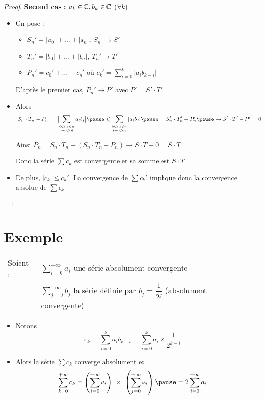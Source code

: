 \begin{frame}
\begin{proof}
\textbf{Second cas :} $a_k\in\mathbb{C}, b_k \in \mathbb{C}$ ($\forall k$)
\begin{itemize}
  \item\pause 
On pose :
\begin{itemize}
  \item $S_n'=|a_0|+\dots+|a_n|$, $S_n'\to S'$
  
  \item\pause $T_n'=|b_0|+\dots+|b_n|$, $T_n'\to T'$
  
  \item\pause $P_n'= c_0'+\dots+ c_n'$ o\`u $c_k'=\sum_{i=0}^k|a_ib_{k-i}|$
\end{itemize}
\pause
D'après le premier cas, $P_n'\to P'$ avec $P'=S' \cdot T'$
\item\pause Alors
$$|S_n \cdot T_n - P_n|= \bigl|\sum_{\stackrel{0\le i,j\le n}{i+j>n}} a_ib_j\bigr| 
\pause \le \sum_{\stackrel{0\le i,j\le n}{i+j>n}} |a_ib_j| 
\pause = S_n' \cdot T_n'-P_n' 
\pause \to S' \cdot T'-P'=0
$$

\pause
Ainsi $P_n=S_n \cdot T_n-(S_n \cdot T_n-P_n)\to S \cdot T-0=S \cdot T$

\pause
Donc la série $\sum c_k$ est convergente et sa somme est $S \cdot T$

\item\pause  De plus, $|c_k|\le c_k'$. \pause La convergence de $\sum c_k'$ implique 
donc la convergence absolue de $\sum c_k$ \qedhere
\end{itemize}
\end{proof}
\end{frame}


\section{Exemple}

\begin{frame}
\begin{exemple}
\begin{tabular}{ll}
Soient :
& $\displaystyle\sum_{i=0}^{+\infty} a_i$ une série absolument convergente \\
\pause
& $\displaystyle\sum_{j=0}^{+\infty} b_j$ la série définie par $b_j = \dfrac{1}{2^j}$ (absolument convergente)
\end{tabular}
 

\begin{itemize}
  \item\pause Notons
$$c_k = \sum_{i=0}^k a_ib_{k-i} = \sum_{i=0}^k a_i \times \frac{1}{2^{k-i}}$$

\item\pause Alors la série $\sum c_k$ converge absolument et
$$\sum_{k=0}^{+\infty} c_k 
= \left(\sum_{i=0}^{+\infty} a_i\right)\ \times\ \left(\sum_{j=0}^{+\infty} b_j\right)
\pause = 2 \sum_{i=0}^{+\infty} a_i$$
\end{itemize}
\end{exemple}
\end{frame}


